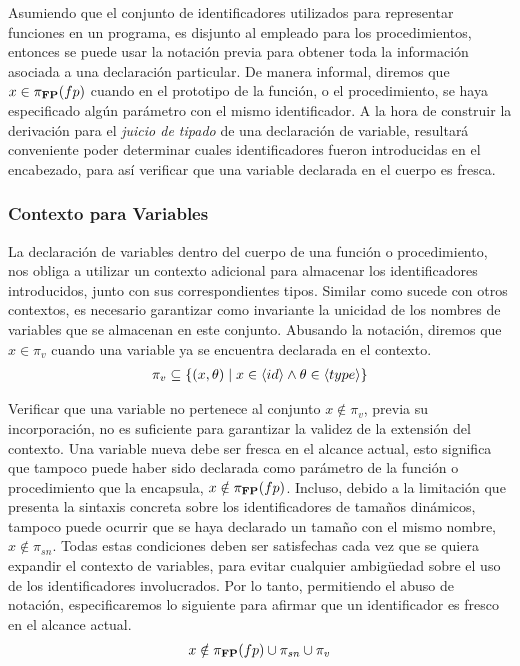 Asumiendo que el conjunto de identificadores utilizados para representar funciones en un programa, es disjunto al empleado para los procedimientos, entonces se puede usar la notación previa para obtener toda la información asociada a una declaración particular.
De manera informal, diremos que $x \in \pi_{\mathbf{FP}}(fp)$ cuando en el prototipo de la función, o el procedimiento, se haya especificado algún parámetro con el mismo identificador.
A la hora de construir la derivación para el \textit{juicio de tipado} de una declaración de variable, resultará conveniente poder determinar cuales identificadores fueron introducidas en el encabezado, para así verificar que una variable declarada en el cuerpo es fresca.

\subsubsection{Contexto para Variables}

La declaración de variables dentro del cuerpo de una función o procedimiento, nos obliga a utilizar un contexto adicional para almacenar los identificadores introducidos, junto con sus correspondientes tipos.
Similar como sucede con otros contextos, es necesario garantizar como invariante la unicidad de los nombres de variables que se almacenan en este conjunto.
Abusando la notación, diremos que $x \in \pi_{v}$ cuando una variable ya se encuentra declarada en el contexto.
\begin{gather*}
\pi_{v} \subseteq \{ (x, \theta) \mid x \in \langle id \rangle \wedge \theta \in \langle type \rangle \}
\end{gather*}

Verificar que una variable no pertenece al conjunto $x \notin \pi_{v}$, previa su incorporación, no es suficiente para garantizar la validez de la extensión del contexto.
Una variable nueva debe ser fresca en el alcance actual, esto significa que tampoco puede haber sido declarada como parámetro de la función o procedimiento que la encapsula, $x \notin \pi_{\mathbf{FP}}(fp)$.
Incluso, debido a la limitación que presenta la sintaxis concreta sobre los identificadores de tamaños dinámicos, tampoco puede ocurrir que se haya declarado un tamaño con el mismo nombre, $x \notin \pi_{sn}$.
Todas estas condiciones deben ser satisfechas cada vez que se quiera expandir el contexto de variables, para evitar cualquier ambigüedad sobre el uso de los identificadores involucrados.
Por lo tanto, permitiendo el abuso de notación, especificaremos lo siguiente para afirmar que un identificador es fresco en el alcance actual.
\begin{gather*}
x \notin \pi_{\mathbf{FP}}(fp) \cup \pi_{sn} \cup \pi_{v}
\end{gather*}

